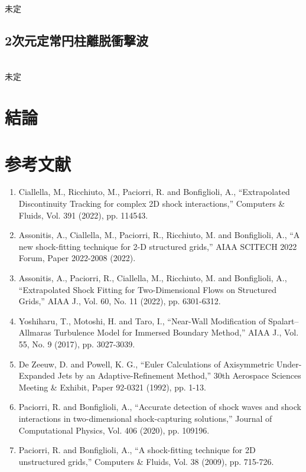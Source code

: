 \documentclass[a4j]{jarticle}
\begin{document}
未定

\subsection{2次元定常円柱離脱衝撃波}\label{subsec:2Dcirc}
\mbox{}\\[-3.0ex]

未定

\section{結論}

\section*{参考文献}

\begin{enumerate}
    \item Ciallella, M., Ricchiuto, M., Paciorri, R. and Bonfiglioli, A., ``Extrapolated Discontinuity Tracking for complex 2D shock interactions,''
     Computers \& Fluids, Vol. 391 (2022), pp. 114543.
\label{ref:eDIT}
    \item Assonitis, A., Ciallella, M., Paciorri, R., Ricchiuto, M. and Bonfiglioli, A., ``A new shock-fitting technique for 2-D structured grids,''
     AIAA SCITECH 2022 Forum, Paper 2022-2008 (2022).
\label{ref:SESF}
    \item Assonitis, A., Paciorri, R., Ciallella, M., Ricchiuto, M. and Bonfiglioli, A., ``Extrapolated Shock Fitting for Two-Dimensional Flows on Structured Grids,''
     AIAA J., Vol. 60, No. 11 (2022), pp. 6301-6312.
\label{ref:SF}
    \item Yoshiharu, T., Motoshi, H. and Taro, I., ``Near-Wall Modification of Spalart–Allmaras Turbulence Model for Immersed Boundary Method,''
     AIAA J., Vol. 55, No. 9 (2017), pp. 3027-3039.
\label{ref:IBM}
    \item De Zeeuw, D. and Powell, K. G., ``Euler Calculations of Axisymmetric Under-Expanded Jets by an Adaptive-Refinement Method,''
     30th Aerospace Sciences Meeting \& Exhibit, Paper 92-0321 (1992), pp. 1-13. 
\label{ref:AMR}
    \item Paciorri, R. and Bonfiglioli, A., ``Accurate detection of shock waves and shock interactions in two-dimensional shock-capturing solutions,''
     Journal of Computational Physics, Vol. 406 (2020), pp. 109196.
\label{ref:intera}
     \item Paciorri, R. and Bonfiglioli, A., ``A shock-fitting technique for 2D unstructured grids,''
      Computers \& Fluids, Vol. 38 (2009), pp. 715-726.
\label{ref:effdomain}
    \end{enumerate}
\end{document}
